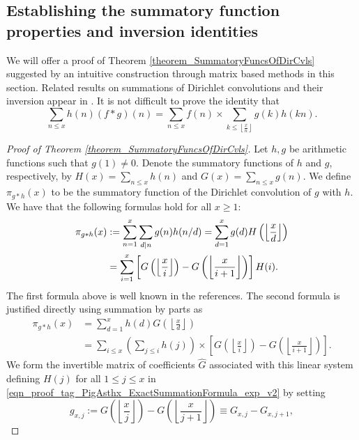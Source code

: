 \documentclass[11pt,reqno,a4letter]{article}
\numberwithin{figure}{section}
\numberwithin{table}{section}
\newcommand{\cf}{\textit{cf.\ }}
\newcommand{\floor}[1]{\left\lfloor #1 \right\rfloor}
\newcommand{\Floor}[2]{\ensuremath{\left\lfloor \frac{#1}{#2} \right\rfloor}}
\theoremstyle{plain}
\numberwithin{theorem}{section}
\theoremstyle{definition}
\begin{document}
\subsection{Establishing the summatory function properties and inversion identities} 

We will offer a proof of Theorem \ref{theorem_SummatoryFuncsOfDirCvls} 
suggested by an intuitive construction through matrix based methods in this section. 
Related results on summations of Dirichlet convolutions and their inversion appear in 
\cite[\S 2.14; \S 3.10; \S 3.12; \cf \S 4.9, p.\ 95]{APOSTOLANUMT}. 
It is not difficult to prove the identity that
\[
\sum_{n \leq x} h(n) (f \ast g)(n) = 
     \sum_{n \leq x} f(n) \times \sum_{k \leq \Floor{x}{n}} g(k) h(kn). 
\]

\begin{proof}[Proof of Theorem \ref{theorem_SummatoryFuncsOfDirCvls}] 
\label{proofOf_theorem_SummatoryFuncsOfDirCvls} 
Let $h,g$ be arithmetic functions such that $g(1) \neq 0$. 
Denote the summatory functions of $h$ and $g$, 
respectively, by $H(x) = \sum_{n \leq x} h(n)$ and $G(x) = \sum_{n \leq x} g(n)$. 
We define $\pi_{g \ast h}(x)$ to be the summatory function of the 
Dirichlet convolution of $g$ with $h$. 
We have that the following formulas hold for all $x \geq 1$: 
\begin{align} 
\notag 
\pi_{g \ast h}(x) & := \sum_{n=1}^{x} \sum_{d|n} g(n) h(n/d) = \sum_{d=1}^x g(d) H\left(\floor{\frac{x}{d}}\right) \\ 
\label{eqn_proof_tag_PigAsthx_ExactSummationFormula_exp_v2} 
     & = \sum_{i=1}^x \left[G\left(\floor{\frac{x}{i}}\right) - G\left(\floor{\frac{x}{i+1}}\right)\right] H(i). 
\end{align} 
The first formula above is well known in the references. The second formula is justified directly using 
summation by parts as \cite[\S 2.10(ii)]{NISTHB} 
\begin{align*} 
\pi_{g \ast h}(x) & = \sum_{d=1}^x h(d) G\left(\floor{\frac{x}{d}}\right) \\ 
     & = \sum_{i \leq x} \left(\sum_{j \leq i} h(j)\right) \times 
     \left[G\left(\floor{\frac{x}{i}}\right) - 
     G\left(\floor{\frac{x}{i+1}}\right)\right]. 
\end{align*} 
We form the invertible matrix of coefficients $\widehat{G}$ 
associated with this linear system defining $H(j)$ for all 
$1 \leq j \leq x$ in \eqref{eqn_proof_tag_PigAsthx_ExactSummationFormula_exp_v2} by setting 
\[
g_{x,j} := G\left(\floor{\frac{x}{j}}\right) - G\left(\floor{\frac{x}{j+1}}\right) \equiv G_{x,j} - G_{x,j+1}, 
\]
\end{proof}
\end{document}
